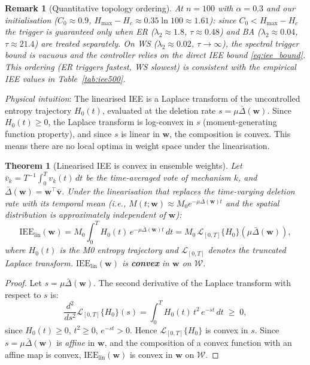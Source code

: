\documentclass[review,12pt]{elsarticle}
\newcommand{\bfw}{\mathbf{w}}
\newcommand{\bfv}{\mathbf{v}}
\newcommand{\IEE}{\mathrm{IEE}}
\newcommand{\Hc}{H_c}
\newcommand{\Hmax}{H_{\max}}
\newcommand{\lambdat}{\lambda_2}
\newtheorem{theorem}{Theorem}
\newtheorem{remark}{Remark}
\begin{document}
\begin{remark}[Quantitative topology ordering]
\label{rem:lambda2}
At $n=100$ with $\alpha=0.3$ and our initialisation ($C_0\approx 0.9$,
$\Hmax-\Hc\approx 0.35\ln 100 \approx 1.61$): since $C_0 < \Hmax-\Hc$
the trigger is guaranteed only when ER ($\lambdat\approx 1.8$, $\tau\approx
0.48$) and BA ($\lambdat\approx 0.04$, $\tau\approx 21.4$) are treated
separately.  On WS ($\lambdat\approx 0.02$, $\tau\to\infty$), the spectral
trigger bound is vacuous and the controller relies on the direct IEE bound
\eqref{eq:iee_bound}.  This ordering (ER triggers fastest, WS slowest)
is consistent with the empirical IEE values in Table~\ref{tab:iee500}.
\end{remark}

\noindent\emph{Physical intuition}: The linearised IEE is a Laplace transform
of the uncontrolled entropy trajectory $H_0(t)$, evaluated at the
deletion rate $s = \mu\bar{\Delta}(\bfw)$.  Since $H_0(t) \geq 0$,
the Laplace transform is log-convex in $s$ (moment-generating function
property), and since $s$ is linear in $\bfw$, the composition is convex.
This means there are no local optima in weight space under the linearisation.

\begin{theorem}[Linearised IEE is convex in ensemble weights]
\label{thm:lin_convex}
Let $\bar{v}_k = T^{-1}\!\int_0^T\! v_k(t)\,dt$ be the time-averaged vote
of mechanism $k$, and $\bar{\Delta}(\bfw) = \bfw^\top\bar{\bfv}$.
Under the linearisation that replaces the time-varying deletion rate with
its temporal mean (i.e., $M(t;\bfw) \approx M_0 e^{-\mu\bar{\Delta}(\bfw)t}$
and the spatial distribution is approximately independent of $\bfw$):
\begin{equation}
  \IEE_{\mathrm{lin}}(\bfw)
    = M_0 \int_0^T H_0(t)\,e^{-\mu\bar{\Delta}(\bfw)t}\,dt
    = M_0\,\mathcal{L}_{[0,T]}\{H_0\}\!\left(\mu\bar{\Delta}(\bfw)\right),
  \label{eq:iee_lin}
\end{equation}
where $H_0(t)$ is the M0 entropy trajectory and $\mathcal{L}_{[0,T]}$
denotes the truncated Laplace transform. $\IEE_{\mathrm{lin}}(\bfw)$ is
\textbf{convex} in $\bfw$ on $\mathcal{W}$.
\end{theorem}

\begin{proof}
Let $s = \mu\bar{\Delta}(\bfw)$.  The second derivative of the Laplace transform
with respect to $s$ is:
\begin{equation}
  \frac{d^2}{ds^2}\mathcal{L}_{[0,T]}\{H_0\}(s)
  = \int_0^T H_0(t)\,t^2\,e^{-st}\,dt \;\geq\; 0,
  \label{eq:laplace_convex}
\end{equation}
since $H_0(t)\geq 0$, $t^2\geq 0$, $e^{-st}>0$.  Hence
$\mathcal{L}_{[0,T]}\{H_0\}$ is convex in $s$.
Since $s = \mu\bar{\Delta}(\bfw)$ is \emph{affine} in $\bfw$, and the composition
of a convex function with an affine map is convex,
$\IEE_{\mathrm{lin}}(\bfw)$ is convex in $\bfw$ on $\mathcal{W}$.
\end{proof}
\end{document}
